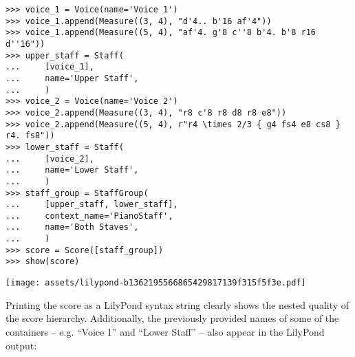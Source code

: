 \begin{abjadbookoutput}
\begin{singlespacing}
\vspace{-0.5\baselineskip}
\begin{lstlisting}
>>> voice_1 = Voice(name='Voice 1')
>>> voice_1.append(Measure((3, 4), "d'4.. b'16 af'4"))
>>> voice_1.append(Measure((5, 4), "af'4. g'8 c''8 b'4. b'8 r16 d''16"))
>>> upper_staff = Staff(
...     [voice_1],
...     name='Upper Staff',
...     )
>>> voice_2 = Voice(name='Voice 2')
>>> voice_2.append(Measure((3, 4), "r8 c'8 r8 d8 r8 e8"))
>>> voice_2.append(Measure((5, 4), r"r4 \times 2/3 { g4 fs4 e8 cs8 } r4. fs8"))
>>> lower_staff = Staff(
...     [voice_2],
...     name='Lower Staff',
...     )
>>> staff_group = StaffGroup(
...     [upper_staff, lower_staff],
...     context_name='PianoStaff',
...     name='Both Staves',
...     )
>>> score = Score([staff_group])
>>> show(score)
\end{lstlisting}
\noindent\texttt{[image: assets/lilypond-b1362195566865429817139f315f5f3e.pdf]}
\end{singlespacing}
\end{abjadbookoutput}

\noindent Printing the score as a LilyPond syntax string clearly shows the
nested quality of the score hierarchy. Additionally, the previously provided
names of some of the containers -- e.g. \enquote{Voice 1} and \enquote{Lower
Staff} -- also appear in the LilyPond output:

\begin{comment}
<abjad>
print(format(score))
</abjad>
\end{comment}


